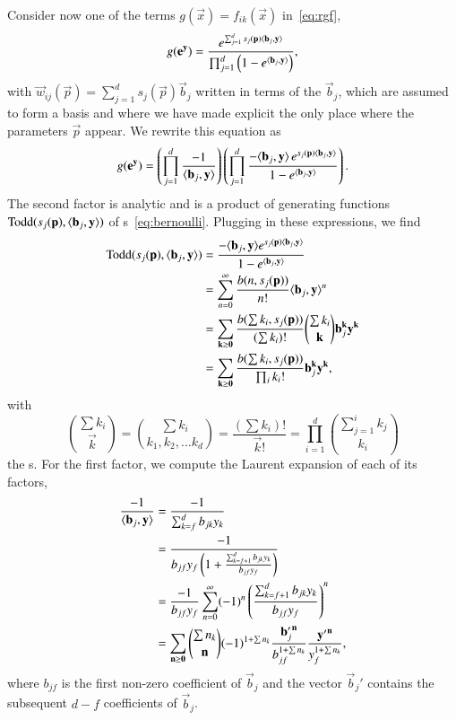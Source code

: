 Consider now one of the terms $g(\vec x) = f_{ik}(\vec x)$ in~\eqref{eq:rgf},
\begin{equation}
\label{eq:exp:term}
g(\vec e^{\vec y}) =
	\frac{e^{\sum_{j=1}^d s_j(\vec p) \sp{b_j}y}}
	     {\prod_{j=1}^{d}\left(1-e^{\sp{b_j}y}\right)}
,
\end{equation}
with $\vec w_{ij}(\vec p) = \sum_{j=1}^d s_j(\vec p) \vec b_j$ written
in terms of the $\vec b_j$, which are assumed to form a basis
and where we have made explicit the only place where the
parameters $\vec p$ appear.
We rewrite this equation as
\begin{equation}
\label{eq:laurent:old}
g(\vec e^{\vec y}) =
	\left(\prod_{j=1}^d \frac{-1}{\sp{b_j}y}\right)
	\left(\prod_{j=1}^d \frac{-\sp{b_j}y \, e^{s_j(\vec p)\sp{b_j}y}}
				 {1-e^{\sp{b_j}y}} \right)
.
\end{equation}
The second factor is analytic and is a product of
generating functions
$\Todd(s_j(\vec p), \sp{b_j}y)$
of s~\eqref{eq:bernoulli}.
Plugging in these expressions, we find
\begin{align}
\Todd(s_j(\vec p), \sp{b_j}y)
&= \frac{-\sp{b_j}y e^{s_j(\vec p)\sp{b_j}y}}
				 {1-e^{\sp{b_j}y}}
\nonumber
\\
&= \sum_{n=0}^\infty \frac{b(n,s_j(\vec p))}{n!} \sp{b_j}y^n
\nonumber
\\
&= \sum_{\vec k \ge \vec 0}
	\frac{b(\sum k_i,s_j(\vec p))}{(\sum k_i)!}
		{\sum k_i \choose \vec k} \vec b_j^{\vec k} \vec y^{\vec k}
\nonumber
\\
&= \sum_{\vec k \ge \vec 0}
	\frac{b(\sum k_i,s_j(\vec p))}{\prod_i k_i!}
		 \vec b_j^{\vec k} \vec y^{\vec k}
\label{eq:laurent:todd}
,
\end{align}
with
$$
{\sum k_i \choose \vec k} =
{\sum k_i \choose k_1, k_2, \ldots k_d} =
\frac{(\sum k_i)!}{\vec k!} =
\prod_{i=1}^d {\sum_{j=1}^i k_j \choose k_i}
$$
the s.
For the first factor, we compute the Laurent expansion
of each of its factors,
\begin{align}
\frac{-1}{\sp{b_j}y}
&= \frac{-1}{\sum_{k=f}^d b_{jk} y_k}
\nonumber
\\
&= \frac{-1}{b_{jf} y_f\left(1 + \frac{\sum_{k=f+1}^d b_{jk} y_k}
					{b_{jf} y_f}\right)}
\nonumber
\\
&= \frac{-1}{b_{jf} y_f}
	\sum_{n=0}^\infty (-1)^n \left(\frac{\sum_{k=f+1}^d b_{jk} y_k}
					{b_{jf} y_f}\right)^n
\nonumber
\\
&= \sum_{\vec n \ge \vec 0}
	{\sum n_k \choose \vec n}
		(-1)^{1+\sum n_k}
		    \frac{{\vec b'_j}^{\vec n}}{b_{jf}^{1+\sum n_k}}
		    \frac{{\vec y'}^{\vec n}}{y_f^{1+\sum n_k}}
\label{eq:laurent:reciprocal}
,
\end{align}
where $b_{jf}$ is the first non-zero coefficient of $\vec b_j$
and the vector $\vec b_j'$ contains
the subsequent $d-f$ coefficients of $\vec b_j$.

